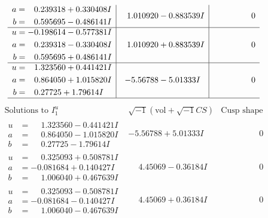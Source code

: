 \documentclass[1p]{elsarticle_modified}
\theoremstyle{definition}
\newcommand{\I}{\sqrt{-1}}
\begin{document}
$$\begin{array}{c|c|c}
\begin{aligned}
a &= \phantom{-}0.239318 + 0.330408 I \\
b &= \phantom{-}0.595695 - 0.486141 I\end{aligned}
 & \phantom{-}1.010920 - 0.883539 I & \phantom{-0.000000 } 0 \\ \hline\begin{aligned}
u &= -0.198614 - 0.577381 I \\
a &= \phantom{-}0.239318 - 0.330408 I \\
b &= \phantom{-}0.595695 + 0.486141 I\end{aligned}
 & \phantom{-}1.010920 + 0.883539 I & \phantom{-0.000000 } 0 \\ \hline\begin{aligned}
u &= \phantom{-}1.323560 + 0.441421 I \\
a &= \phantom{-}0.864050 + 1.015820 I \\
b &= \phantom{-}0.27725 + 1.79614 I\end{aligned}
 & -5.56788 - 5.01333 I & \phantom{-0.000000 } 0\\
 \hline 
 \end{array}$$\newpage$$\begin{array}{c|c|c}  
\text{Solutions to }I^u_{1}& \I (\text{vol} + \sqrt{-1}CS) & \text{Cusp shape}\\
 \hline 
\begin{aligned}
u &= \phantom{-}1.323560 - 0.441421 I \\
a &= \phantom{-}0.864050 - 1.015820 I \\
b &= \phantom{-}0.27725 - 1.79614 I\end{aligned}
 & -5.56788 + 5.01333 I & \phantom{-0.000000 } 0 \\ \hline\begin{aligned}
u &= \phantom{-}0.325093 + 0.508781 I \\
a &= -0.081684 + 0.140427 I \\
b &= \phantom{-}1.006040 + 0.467639 I\end{aligned}
 & \phantom{-}4.45069 - 0.36184 I & \phantom{-0.000000 } 0 \\ \hline\begin{aligned}
u &= \phantom{-}0.325093 - 0.508781 I \\
a &= -0.081684 - 0.140427 I \\
b &= \phantom{-}1.006040 - 0.467639 I\end{aligned}
 & \phantom{-}4.45069 + 0.36184 I & \phantom{-0.000000 } 0 \\ \hline\begin{aligned}

\end{aligned}
\end{array}$$
\end{document}

